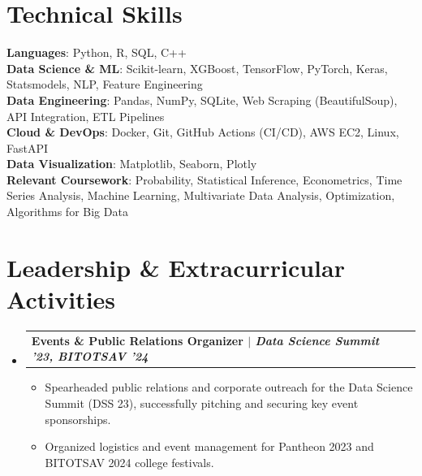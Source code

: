 \documentclass[a4paper,10pt]{article}
\makeatletter
\newcommand{\resumeItem}[1]{\item{\small{#1}}}
\newcommand{\resumeProjectHeading}[2]{\vspace{0.5mm}\item
    \begin{tabular*}{0.98\textwidth}[t]{l@{\extracolsep{\fill}}r}
      \textbf{#1} & \textit{\footnotesize{#2}}
    \end{tabular*}
}
\newcommand{\resumeSubHeadingListStart}{\begin{itemize}[leftmargin=*,labelsep=0mm]}
\newcommand{\resumeSubHeadingListEnd}{\end{itemize}\vspace{2mm}}
\newcommand{\resumeItemListStart}{\begin{itemize}[leftmargin=3ex, rightmargin=2ex, noitemsep,labelsep=1.2mm,itemsep=0mm]\small}
\newcommand{\resumeItemListEnd}{\end{itemize}\vspace{-2mm}}
\makeatother
\begin{document}
\section{Technical Skills}
\begin{itemize}[leftmargin=0.05in, label={}]
    \small{\item{
     \textbf{Languages}: Python, R, SQL, C++ \\
     \textbf{Data Science \& ML}: Scikit-learn, XGBoost, TensorFlow, PyTorch, Keras, Statsmodels, NLP, Feature Engineering \\ 
     \textbf{Data Engineering}: Pandas, NumPy, SQLite, Web Scraping (BeautifulSoup), API Integration, ETL Pipelines \\
     \textbf{Cloud \& DevOps}: Docker, Git, GitHub Actions (CI/CD), AWS EC2, Linux, FastAPI \\
     \textbf{Data Visualization}: Matplotlib, Seaborn, Plotly \\
     \textbf{Relevant Coursework}: Probability, Statistical Inference, Econometrics, Time Series Analysis, Machine Learning, Multivariate Data Analysis, Optimization, Algorithms for Big Data
    }}
\end{itemize}

\section{Leadership \& Extracurricular Activities}
\resumeSubHeadingListStart
    \resumeProjectHeading
        {\textbf{Events \& Public Relations Organizer} $|$ \textit{Data Science Summit '23, BITOTSAV '24}}{}
    \resumeItemListStart
        \resumeItem{Spearheaded public relations and corporate outreach for the Data Science Summit (DSS 23), successfully pitching and securing key event sponsorships.}
        \resumeItem{Organized logistics and event management for Pantheon 2023 and BITOTSAV 2024 college festivals.}
    \resumeItemListEnd
\resumeSubHeadingListEnd
\end{document}
